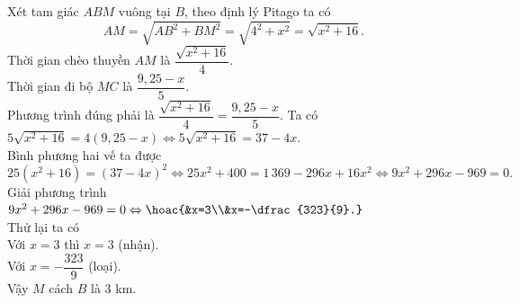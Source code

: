\begin{ex}
{\begin{itemchoice}
		\itemch Xét tam giác $ABM$ vuông tại $B$, theo định lý Pitago ta có\\ $$AM = \sqrt{AB^2 + BM^2} = \sqrt{4^2 + x^2} = \sqrt{x^2 + 16}.$$
		\itemch Thời gian chèo thuyền $AM$ là $\dfrac{\sqrt{x^2 + 16}}{4}$.\\Thời gian đi bộ $MC$ là $\dfrac{9,25 - x}{5}$.\\ Phương trình đúng phải là $\dfrac{\sqrt{x^2 + 16}}{4} = \dfrac{9{,}25 - x}{5}$.
		\itemch Ta có $5\sqrt{x^2 + 16} = 4(9{,}25 - x) \Leftrightarrow 5\sqrt{x^2 + 16} = 37 - 4x$. \\
		Bình phương hai vế ta được $$25(x^2 + 16) = (37 - 4x)^2 \Leftrightarrow 25x^2 + 400 = 1\,369 - 296x + 16x^2 \Leftrightarrow 9x^2 + 296x - 969 = 0.$$
		\itemch  Giải phương trình $9x^2 + 296x - 969 = 0\Leftrightarrow \hoac{&x=3\\&x=-\dfrac{323}{9}.}$\\
		Thử lại ta có\\
		Với $x=3$ thì $x = 3$ (nhận).\\
		Với $x = -\dfrac{323}{9}$ (loại).\\ Vậy $M$ cách $B$ là $3$ km.
	\end{itemchoice}
	}
\end{ex}
